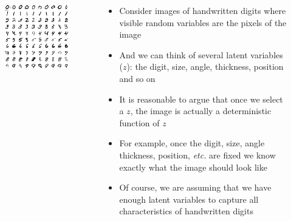 \documentclass[serif,aspectratio=169,dvipsnames]{beamer}
\begin{document}
\begin{frame}
	\begin{columns}
		\begin{overlayarea}{\textwidth}{\textheight}
			\vspace{3pt}
			\begin{figure}
				\centering
				\includegraphics[scale=0.3]{images/mnist.png}
			\end{figure}
		\end{overlayarea}
		\begin{overlayarea}{\textwidth}{\textheight}
			\begin{itemize}\justifying
				\item<1-> Consider images of handwritten digits where visible random variables are the pixels of the image
				\item<2-> And we can think of several latent variables ($z$): the digit, size, angle, thickness, position and so on
				\item<3-> It is reasonable to argue that once we select a $z$, the image is actually a deterministic function of $z$
				\item<4-> For example, once the digit, size, angle thickness, position, \textit{etc.} are fixed we know exactly what the image should look like
				\item<5-> Of course, we are assuming that we have enough latent variables to capture all characteristics of handwritten digits 
			\end{itemize}
		\end{overlayarea}
	\end{columns}
\end{frame}
\end{document}

